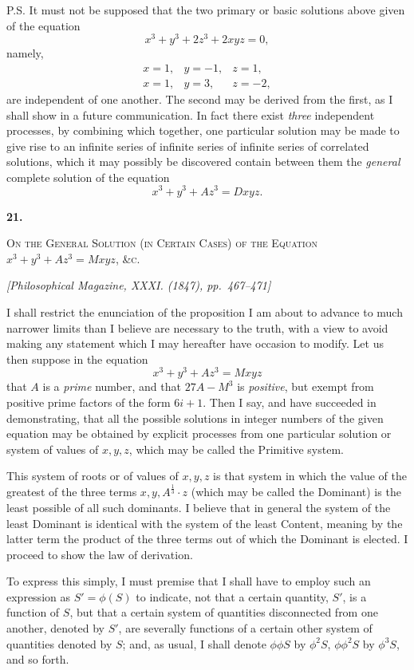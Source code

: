 \documentclass[11pt]{article}
\newcommand{\paperhead}[3]{%
  \clearpage
  \begin{center}
  {\Large\bfseries #1.}\par\vspace{0.85em}
  {\large\scshape #2}\par\vspace{0.6em}
  {\itshape [#3]}\par
  \end{center}\vspace{0.4em}}
\newcommand{\sourcepage}[1]{\marginpar{\scriptsize p.~#1}}
\begin{document}
{{P.S. It must not be supposed that the two primary or basic solutions above given of the equation
\[
x^3+y^3+2z^3+2xyz=0,
\]
namely,
\[
\begin{array}{rrr}
x=1,& y=-1,& z=1,\\
x=1,& y=3,& z=-2,
\end{array}
\]
are independent of one another. The second may be derived from the first, as I shall show in a future communication. In fact there exist \emph{three} independent processes, by combining which together, one particular solution may be made to give rise to an infinite series of infinite series of infinite series of correlated solutions, which it may possibly be discovered contain between them the \emph{general} complete solution of the equation
\[
x^3+y^3+Az^3=Dxyz.
\]

\paperhead{21}{On the General Solution (in Certain Cases) of the Equation $x^3+y^3+Az^3=Mxyz$, \&c.}{Philosophical Magazine, XXXI. (1847), pp.~467--471}

\sourcepage{114}
I shall restrict the enunciation of the proposition I am about to advance to much narrower limits than I believe are necessary to the truth, with a view to avoid making any statement which I may hereafter have occasion to modify. Let us then suppose in the equation
\[
x^3+y^3+Az^3=Mxyz
\]
that $A$ is a \emph{prime} number, and that $27A-M^3$ is \emph{positive}, but exempt from positive prime factors of the form $6i+1$. Then I say, and have succeeded in demonstrating, that all the possible solutions in integer numbers of the given equation may be obtained by explicit processes from one particular solution or system of values of $x,y,z$, which may be called the Primitive system.

This system of roots or of values of $x,y,z$ is that system in which the value of the greatest of the three terms $x,y,A^{\frac{1}{3}}\cdot z$ (which may be called the Dominant) is the least possible of all such dominants. I believe that in general the system of the least Dominant is identical with the system of the least Content, meaning by the latter term the product of the three terms out of which the Dominant is elected. I proceed to show the law of derivation.

To express this simply, I must premise that I shall have to employ such an expression as $S'=\phi(S)$ to indicate, not that a certain quantity, $S'$, is a function of $S$, but that a certain system of quantities disconnected from one another, denoted by $S'$, are severally functions of a certain other system of quantities denoted by $S$; and, as usual, I shall denote $\phi\phi S$ by $\phi^2S$, $\phi\phi^2S$ by $\phi^3S$, and so forth.

}}
\end{document}
